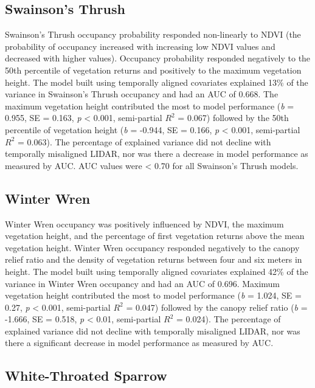 \documentclass[
  12pt,
]{article}
\begin{document}
\hypertarget{swainsons-thrush}{%
\subsection{Swainson's Thrush}\label{swainsons-thrush}}

Swainson's Thrush occupancy probability responded non-linearly to NDVI (the probability of occupancy increased with increasing low NDVI values and decreased with higher values). Occupancy probability responded negatively to the 50th percentile of vegetation returns and positively to the maximum vegetation height. The model built using temporally aligned covariates explained 13\% of the variance in Swainson's Thrush occupancy and had an AUC of 0.668. The maximum vegetation height contributed the most to model performance (\emph{b} = 0.955, SE = 0.163, \emph{p} \textless{} 0.001, semi-partial \(R^2\) = 0.067) followed by the 50th percentile of vegetation height (\emph{b} = -0.944, SE = 0.166, \emph{p} \textless{} 0.001, semi-partial \(R^2\) = 0.063). The percentage of explained variance did not decline with temporally misaligned LIDAR, nor was there a decrease in model performance as measured by AUC. AUC values were \textless{} 0.70 for all Swainson's Thrush models.

\hypertarget{winter-wren}{%
\subsection{Winter Wren}\label{winter-wren}}

Winter Wren occupancy was positively influenced by NDVI, the maximum vegetation height, and the percentage of first vegetation returns above the mean vegetation height. Winter Wren occupancy responded negatively to the canopy relief ratio and the density of vegetation returns between four and six meters in height. The model built using temporally aligned covariates explained 42\% of the variance in Winter Wren occupancy and had an AUC of 0.696. Maximum vegetation height contributed the most to model performance (\emph{b} = 1.024, SE = 0.27, \emph{p} \textless{} 0.001, semi-partial \(R^2\) = 0.047) followed by the canopy relief ratio (\emph{b} = -1.666, SE = 0.518, \emph{p} \textless{} 0.01, semi-partial \(R^2\) = 0.024). The percentage of explained variance did not decline with temporally misaligned LIDAR, nor was there a significant decrease in model performance as measured by AUC.

\hypertarget{white-throated-sparrow}{%
\subsection{White-Throated Sparrow}\label{white-throated-sparrow}}
\end{document}
